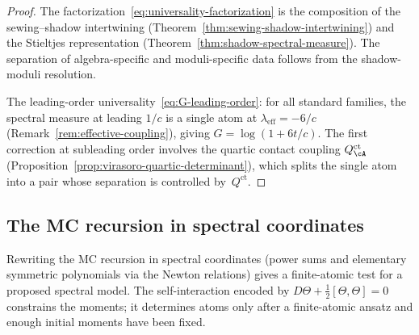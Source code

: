 \begin{proof}
The factorization~\eqref{eq:universality-factorization}
is the composition of the sewing--shadow intertwining
(Theorem~\ref{thm:sewing-shadow-intertwining}) and the
Stieltjes representation
(Theorem~\ref{thm:shadow-spectral-measure}). The
separation of algebra-specific and moduli-specific data
follows from the shadow-moduli resolution.

The leading-order universality~\eqref{eq:G-leading-order}:
for all standard families, the spectral measure at
leading $1/c$ is a single atom at
$\lambda_{\mathrm{eff}} = -6/c$
(Remark~\ref{rem:effective-coupling}), giving
$G = \log(1 + 6t/c)$. The first correction at subleading
order involves the quartic contact coupling
$Q^{\mathrm{ct}}_\cA$
(Proposition~\ref{prop:virasoro-quartic-determinant}),
which splits the single atom into a pair whose
separation is controlled by~$Q^{\mathrm{ct}}$.
\end{proof}

\subsection{The MC recursion in spectral coordinates}%
\label{sec:mc-newton-identities}%

Rewriting the MC recursion in spectral coordinates (power sums
and elementary symmetric polynomials via the Newton relations)
gives a finite-atomic test for a proposed spectral model. The
self-interaction encoded by
$D\Theta + \tfrac{1}{2}[\Theta,\Theta] = 0$
constrains the moments; it determines atoms only after a
finite-atomic ansatz and enough initial moments have been fixed.

